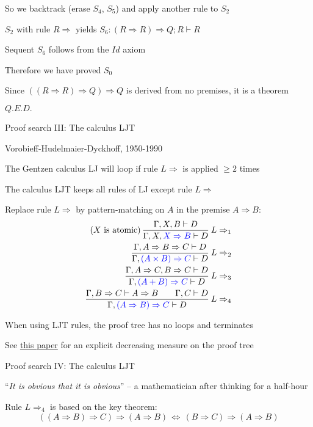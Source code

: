 So we backtrack (erase $S_{4}$, $S_{5}$) and apply another rule
to $S_{2}$

$S_{2}$ with rule $R\Rightarrow$ yields $S_{6}:\left(R\Rightarrow R\right)\Rightarrow Q;R\vdash R$

Sequent $S_{6}$ follows from the $Id$ axiom

Therefore we have proved $S_{0}$

Since $\left(\left(R\Rightarrow R\right)\Rightarrow Q\right)\Rightarrow Q$
is derived from no premises, it is a theorem

$Q.E.D.$

Proof search III: The calculus LJT

Vorobieff-Hudelmaier-Dyckhoff, 1950-1990

The Gentzen calculus LJ will loop if rule $L\Rightarrow$ is applied
$\geq2$ times

The calculus LJT keeps all rules of LJ except rule $L\Rightarrow$

Replace rule $L\Rightarrow$ by pattern-matching on $A$ in the premise
$A\Rightarrow B$:
\begin{align*}
\text{(}X\text{ is atomic)\,}\frac{\Gamma,X,B\vdash D}{\Gamma,X,{\color{blue}X\Rightarrow B}\vdash D}\:L\Rightarrow_{1}\\
\frac{\Gamma,A\Rightarrow B\Rightarrow C\vdash D}{\Gamma,{\color{blue}(A\times B)\Rightarrow C}\vdash D}\:L\Rightarrow_{2}\\
\frac{\Gamma,A\Rightarrow C,B\Rightarrow C\vdash D}{\Gamma,{\color{blue}(A+B)\Rightarrow C}\vdash D}\:L\Rightarrow_{3}\\
\frac{\Gamma,B\Rightarrow C\vdash A\Rightarrow B\quad\quad\Gamma,C\vdash D}{\Gamma,{\color{blue}(A\Rightarrow B)\Rightarrow C}\vdash D}\:L\Rightarrow_{4}
\end{align*}

When using LJT rules, the proof tree has no loops and terminates

See \href{http://citeseer.ist.psu.edu/viewdoc/summary?doi=10.1.1.35.2618}{this paper}
for an explicit decreasing measure on the proof tree

Proof search IV: The calculus LJT

``\emph{It is obvious that it is obvious}'' – a mathematician after
thinking for a half-hour

Rule $L\Rightarrow_{4}$ is based on the key theorem: {\footnotesize{}
\[
\left(\left(A\Rightarrow B\right)\Rightarrow C\right)\Rightarrow\left(A\Rightarrow B\right)\,\Longleftrightarrow\,\left(B\Rightarrow C\right)\Rightarrow\left(A\Rightarrow B\right)
\]
}{\footnotesize\par}


